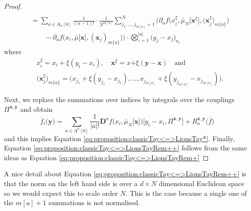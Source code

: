 \documentclass[a4paper,11pt,twoside]{article}
\numberwithin{equation}{section}
\theoremstyle{plain}
\newcommand{\rD}{\mathbf{D}}
\newcommand{\1}{\mathbbm{1}}
\begin{document}
\begin{proof}
\begin{align*}
			\\
			&= \sum_{a\in A_n[0]} \frac{1}{(n-1)!} \cdot \frac{1}{N^{m[a]}} \sum_{j_1, ..., j_{m[a]} = 1}^N \bigg( \partial_a f\Big( x_i^{\xi}, \bar{\mu}_N\big[ \boldsymbol{x}^{\xi} \big], \big( \boldsymbol{x}_j^\xi \big)_{m\{a\}} \Big) 
			\\
			&\qquad - \partial_a f \Big( x_i, \bar{\mu}\big[\boldsymbol{x}\big], (\boldsymbol{x}_j)_{m\{a\}} \Big) \bigg) \cdot \bigotimes_{\iota = 1}^{|a|} \big( y_j - x_j \big)_{a_{\iota}} 
		\end{align*}
		where 
		\begin{align*}
			&x_i^{\xi} = x_i + \xi(y_i - x_i), \quad \boldsymbol{x}^{\xi}= x\boldsymbol{+}\xi(\boldsymbol{y}-\boldsymbol{x}) \quad \mbox{and}\quad 
			\\
			&\big( \boldsymbol{x}_{j}^{\xi} \big)_{m\{a\}} = \Big( x_{j_1} + \xi(y_{j_1} - x_{j_1}), ..., x_{j_{m[a]}} + \xi(y_{j_{m[a]}} - x_{j_{m[a]}}) \Big). 
		\end{align*}
		
		Next, we replace the summations over indices by integrals over the couplings $\Pi^{\boldsymbol{x}, \boldsymbol{y}}$ and obtain
		\begin{equation*}
			\overline{f}_i\big( \boldsymbol{y}\big) = \sum_{a\in A^{n}[0]} \frac{1}{|a|!} \rD^a f \Big(x_i, \bar{\mu}_N\big[ \boldsymbol{x} \big] \Big)\Big[ y_i - x_i, \Pi^{\boldsymbol{x}, \boldsymbol{y}} \Big] + {R}_n^{\boldsymbol{x}, \boldsymbol{y}}\big( \overline{f} \big)
		\end{equation*}
		and this implies Equation \eqref{eq:proposition:classicTay<=>LionsTay*}. Finally, Equation \eqref{eq:proposition:classicTay<=>LionsTayRem++} follows from the same ideas as Equation \eqref{eq:proposition:classicTay<=>LionsTayRem+}
	\end{proof}
	A nice detail about Equation \eqref{eq:proposition:classicTay<=>LionsTayRem++} is that the norm on the left hand side is over a $d \times N$ dimensional Euclidean space so we would expect this to scale order $N$. This is the case because a single one of the $m[a]+1$ summations is not normalised. 
	
\end{document}
